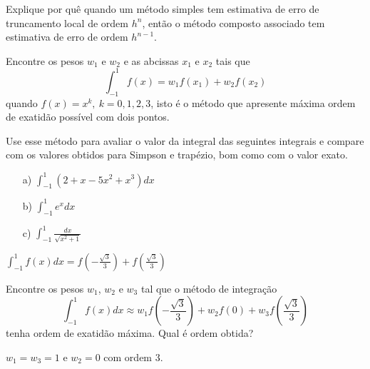 \begin{exer} Explique por quê quando um método simples tem estimativa de erro de truncamento local de ordem $h^n$, então o método composto associado tem estimativa de erro de ordem $h^{n-1}$.
\end{exer}

\begin{exer} Encontre os pesos $w_1$ e $w_2$ e as abcissas $x_1$ e $x_2$ tais que
$$\int_{-1}^1f(x)=w_1f(x_1)+w_2f(x_2)$$
quando $f(x)=x^k, ~k=0,1,2,3$, isto é o método que apresente máxima ordem de exatidão possível com dois pontos.

Use esse método para avaliar o valor da integral das seguintes integrais e compare com os valores obtidos para Simpson e trapézio, bom como com o valor exato.
\begin{itemize}
\item[a)] $\int_{-1}^1\left(2+x-5x^2+x^3\right)dx$
\item[b)] $\int_{-1}^1e^{x}dx$
\item[c)] $\int_{-1}^1\frac{dx}{\sqrt{x^2+1}}$
\end{itemize}
\end{exer}
\begin{resp}
  
$\int_{-1}^1f(x)dx=f\left(-\frac{\sqrt{3}}{3}\right)+f\left(\frac{\sqrt{3}}{3}\right)$    
  
\end{resp}


\begin{exer} Encontre os pesos $w_1$, $w_2$ e $w_3$ tal que o método de integração
$$\int_{-1}^1 f(x)dx \approx w_1 f\left(-\frac{\sqrt{3}}{3}\right)  + w_2f(0) + w_3f\left(\frac{\sqrt{3}}{3}\right)$$
tenha ordem de exatidão máxima. Qual é ordem obtida?
\end{exer}
\begin{resp}
  
$w_1=w_3=1$ e $w_2=0$ com ordem 3.    
  
\end{resp}


% 
